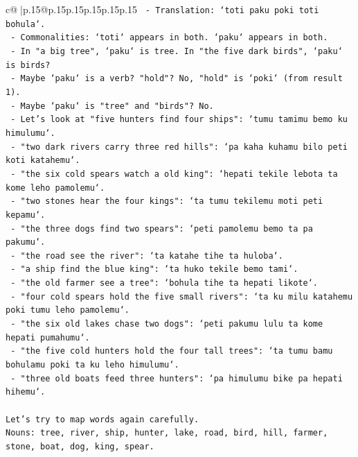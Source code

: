 \documentclass{article}
\begin{document}
{\begin{supertabular}{c@{$\;$}|p{.15\linewidth}@{}p{.15\linewidth}p{.15\linewidth}p{.15\linewidth}p{.15\linewidth}p{.15\linewidth}}
{{{\texttt{               {-} Translation: `toti paku poki toti bohula`.} \\
\texttt{               {-} Commonalities: `toti` appears in both. `paku` appears in both.} \\
\texttt{               {-} In "a big tree", `paku` is tree. In "the five dark birds", `paku` is birds?} \\
\texttt{               {-} Maybe `paku` is a verb? "hold"? No, "hold" is `poki` (from result 1).} \\
\texttt{               {-} Maybe `paku` is "tree" and "birds"? No.} \\
\texttt{               {-} Let's look at "five hunters find four ships": `tumu tamimu bemo ku himulumu`.} \\
\texttt{               {-} "two dark rivers carry three red hills": `pa kaha kuhamu bilo peti koti katahemu`.} \\
\texttt{               {-} "the six cold spears watch a old king": `hepati tekile lebota ta kome leho pamolemu`.} \\
\texttt{               {-} "two stones hear the four kings": `ta tumu tekilemu moti peti kepamu`.} \\
\texttt{               {-} "the three dogs find two spears": `peti pamolemu bemo ta pa pakumu`.} \\
\texttt{               {-} "the road see the river": `ta katahe tihe ta huloba`.} \\
\texttt{               {-} "a ship find the blue king": `ta huko tekile bemo tami`.} \\
\texttt{               {-} "the old farmer see a tree": `bohula tihe ta hepati likote`.} \\
\texttt{               {-} "four cold spears hold the five small rivers": `ta ku milu katahemu poki tumu leho pamolemu`.} \\
\texttt{               {-} "the six old lakes chase two dogs": `peti pakumu lulu ta kome hepati pumahumu`.} \\
\texttt{               {-} "the five cold hunters hold the four tall trees": `ta tumu bamu bohulamu poki ta ku leho himulumu`.} \\
\texttt{               {-} "three old boats feed three hunters": `pa himulumu bike pa hepati hihemu`.} \\
\\ 
\texttt{Let's try to map words again carefully.} \\
\texttt{Nouns: tree, river, ship, hunter, lake, road, bird, hill, farmer, stone, boat, dog, king, spear.} \\
}}}
\end{supertabular}}
\end{document}
